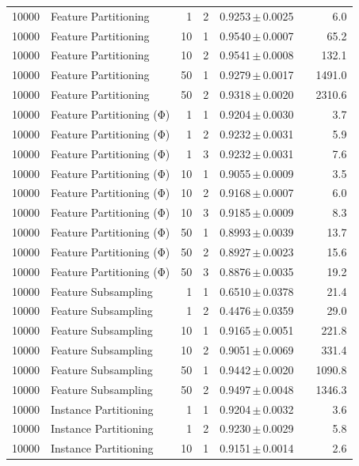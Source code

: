 \begin{table}[ht]
\begin{tabular}{rlrrccr}
10000 & Feature Partitioning & 1 & 2 & 0.9253\,$\pm$\,0.0025 &  & 6.0 \\
10000 & Feature Partitioning & 10 & 1 & 0.9540\,$\pm$\,0.0007 &  & 65.2 \\
10000 & Feature Partitioning & 10 & 2 & 0.9541\,$\pm$\,0.0008 &  & 132.1 \\
10000 & Feature Partitioning & 50 & 1 & 0.9279\,$\pm$\,0.0017 &  & 1491.0 \\
10000 & Feature Partitioning & 50 & 2 & 0.9318\,$\pm$\,0.0020 &  & 2310.6 \\
10000 & Feature Partitioning (Φ) & 1 & 1 & 0.9204\,$\pm$\,0.0030 &  & 3.7 \\
10000 & Feature Partitioning (Φ) & 1 & 2 & 0.9232\,$\pm$\,0.0031 &  & 5.9 \\
10000 & Feature Partitioning (Φ) & 1 & 3 & 0.9232\,$\pm$\,0.0031 &  & 7.6 \\
10000 & Feature Partitioning (Φ) & 10 & 1 & 0.9055\,$\pm$\,0.0009 &  & 3.5 \\
10000 & Feature Partitioning (Φ) & 10 & 2 & 0.9168\,$\pm$\,0.0007 &  & 6.0 \\
10000 & Feature Partitioning (Φ) & 10 & 3 & 0.9185\,$\pm$\,0.0009 &  & 8.3 \\
10000 & Feature Partitioning (Φ) & 50 & 1 & 0.8993\,$\pm$\,0.0039 &  & 13.7 \\
10000 & Feature Partitioning (Φ) & 50 & 2 & 0.8927\,$\pm$\,0.0023 &  & 15.6 \\
10000 & Feature Partitioning (Φ) & 50 & 3 & 0.8876\,$\pm$\,0.0035 &  & 19.2 \\
10000 & Feature Subsampling & 1 & 1 & 0.6510\,$\pm$\,0.0378 &  & 21.4 \\
10000 & Feature Subsampling & 1 & 2 & 0.4476\,$\pm$\,0.0359 &  & 29.0 \\
10000 & Feature Subsampling & 10 & 1 & 0.9165\,$\pm$\,0.0051 &  & 221.8 \\
10000 & Feature Subsampling & 10 & 2 & 0.9051\,$\pm$\,0.0069 &  & 331.4 \\
10000 & Feature Subsampling & 50 & 1 & 0.9442\,$\pm$\,0.0020 &  & 1090.8 \\
10000 & Feature Subsampling & 50 & 2 & 0.9497\,$\pm$\,0.0048 &  & 1346.3 \\
10000 & Instance Partitioning & 1 & 1 & 0.9204\,$\pm$\,0.0032 &  & 3.6 \\
10000 & Instance Partitioning & 1 & 2 & 0.9230\,$\pm$\,0.0029 &  & 5.8 \\
10000 & Instance Partitioning & 10 & 1 & 0.9151\,$\pm$\,0.0014 &  & 2.6 \\

\end{tabular}
\end{table}
